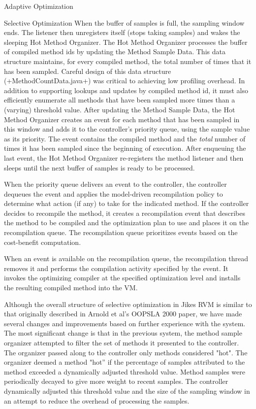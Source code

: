 \begin{section}{Adaptive Optimization}
\begin{subsection}{Selective Optimization}
When the buffer of samples is full, the sampling window ends. The listener then unregisters itself (stops taking samples) and wakes the sleeping Hot Method Organizer.  The Hot Method Organizer processes the buffer of compiled method ids by updating the Method Sample Data.  This data structure maintains, for every compiled method, the total number of times that it has been sampled. Careful design of this data structure (\spverb+MethodCountData.java+) was critical to achieving low profiling overhead. In addition to supporting lookups and updates by compiled method id, it must also efficiently enumerate all methods that have been sampled more times than a (varying) threshold value. After updating the Method Sample Data, the Hot Method Organizer creates an event for each method that has been sampled in this window and adds it to the controller's priority queue, using the sample value as its priority. The event contains the compiled method and the \textit{total} number of times it has been sampled  since the beginning of execution.  After enqueuing the last event, the Hot Method Organizer re-registers the method listener and then sleeps until the next buffer of samples is ready to be processed.

When the priority queue delivers an event to the controller, the controller dequeues the event and applies the model-driven recompilation policy to determine what action (if any) to take for the indicated method.  If the controller decides to recompile the method, it creates a recompilation event that describes the method to be compiled and the optimization plan to use and places it on the recompilation queue. The recompilation queue prioritizes events based on the cost-benefit computation.

When an event is available on the recompilation queue, the recompilation thread removes it and performs the compilation activity specified by the event. It invokes the optimizing compiler at the specified optimization level and installs the resulting compiled method into the VM. 

Although the overall structure of selective optimization in Jikes RVM is similar to that originally described in Arnold et al's OOPSLA 2000 paper, we have made several changes and improvements based on further experience with the system. The most significant change is that in the previous system, the method sample organizer attempted to filter the set of methods it presented to the controller.  The organizer passed along to the controller only methods considered "hot".  The organizer deemed a method "hot'' if the percentage of samples attributed to the method exceeded a dynamically adjusted threshold value. Method samples were periodically decayed to give more weight to recent samples. The controller dynamically adjusted this threshold value and the size of the sampling window in an attempt to reduce the overhead of processing the samples.


\end{subsection}
\end{section}

